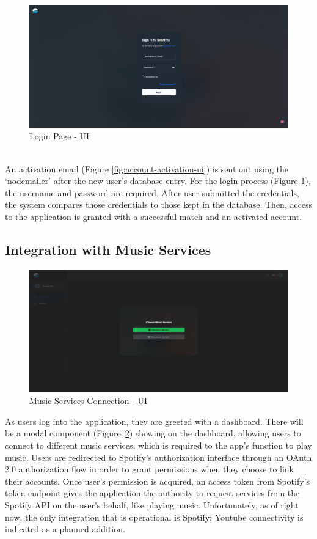 \begin{figure}[h!]
    \centering
    \includegraphics[width=14cm]{Images/login-ui.png}
    \caption{Login Page - UI}
    \label{fig:login-page-ui}
\end{figure}
\\
\indent An activation email (Figure \ref{fig:account-activation-ui}) is sent out using the `nodemailer' after the new user's database entry.
For the login process (Figure \ref{fig:login-page-ui}), the username and password are required.
After user submitted the credentials, the system compares those credentials to those kept in the database. 
Then, access to the application is granted with a successful match and an activated account.
\\
\subsection{Integration with Music Services}
\begin{figure}[h!]
    \centering
    \includegraphics[width=14cm]{Images/connect-api.png}
    \caption{Music Services Connection - UI}
    \label{fig:music-service}
\end{figure}
As users log into the application, they are greeted with a dashboard.
There will be a modal component (Figure~\ref{fig:music-service}) showing on the dashboard, allowing users to connect to different music services, which is required to the app's function to play music.
Users are redirected to Spotify's authorization interface through an OAuth 2.0 authorization flow in order to grant permissions when they choose to link their accounts.
Once user's permission is acquired, an access token from Spotify's token endpoint gives the application the authority to request services from the Spotify API on the user's behalf, like playing music.
Unfortunately, as of right now, the only integration that is operational is Spotify; Youtube connectivity is indicated as a planned addition.
\\
